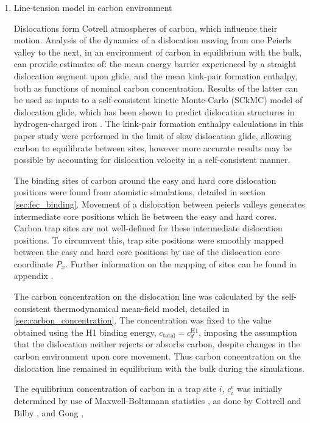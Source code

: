 \documentclass[a4paper,12pt,oneside,print,numbered,index,PageStyleIII]{PhDThesisPSnPDF}
\begin{document}
\begin{enumerate}
\item Line-tension model in carbon environment
\label{sec:org1d944d7}

Dislocations form Cotrell atmospheres of carbon, which influence their
motion. Analysis of the dynamics of a dislocation moving from one Peierls
valley to the next, in an environment of carbon in equilibrium with the
bulk, can provide estimates of: the mean energy barrier experienced by a
straight dislocation segment upon glide, and the mean kink-pair formation
enthalpy, both as functions of nominal carbon concentration. Results of the latter
can be used as inputs to a self-consistent kinetic Monte-Carlo
(SCkMC) model of dislocation glide, which has been shown to predict
dislocation structures in hydrogen-charged iron \cite{Gong2020}. The kink-pair
formation enthalpy calculations in this paper study were performed in
the limit of slow dislocation glide, allowing carbon to equilibrate between
sites, however more accurate results may be possible by accounting for
dislocation velocity in a self-consistent manner.


The binding sites of carbon around the easy and hard core dislocation
positions were found from atomistic simulations, detailed in section
\ref{sec:fec_binding}. Movement of a dislocation between peierls valleys
generates intermediate core positions which lie between the easy and hard
cores. Carbon trap sites are not well-defined for these intermediate
dislocation positions. To circumvent this, trap site positions were smoothly mapped between
the easy and hard core positions by use of the dislocation core coordinate
\(P_x\). Further information on the mapping of sites can be found in appendix
\label{sec:smoothsitemapping}.


The carbon concentration on the dislocation line was calculated by the
self-consistent thermodynamical mean-field model, detailed in
\ref{sec:carbon_concentration}. The concentration was fixed to the value
obtained using the H1 binding energy, \(c_{\text{total}} = c_d^{\text{H}1}\),
imposing the assumption that the dislocation neither rejects or absorbs
carbon, despite changes in the carbon environment upon core
movement. Thus carbon concentration on the dislocation line remained in
equilibrium with the bulk during the simulations.

The equilibrium concentration of carbon in a trap site \(i\),
\(c_{i}^{\text{e}}\) was initially determined by use of
Maxwell-Boltzmann statistics \cite{Anderson2017}, as done by Cottrell and
Bilby \cite{Cottrell1949}, and Gong \cite{Gong2020},


\end{enumerate}
\end{document}
